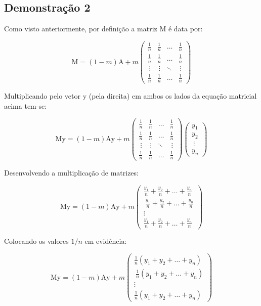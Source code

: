 \documentclass[a4paper, 12pt]{article}
\begin{document}
\subsection{Demonstração 2}

Como visto anteriormente, por definição a matriz $\mathrm{M}$ é data por:

$$\mathrm{M}=\left(1-m\right)\mathrm{A}+m\begin{pmatrix}
\frac{1}{n}&\frac{1}{n}&\dots &\frac{1}{n}\\
\frac{1}{n}&\frac{1}{n}&\dots &\frac{1}{n}\\
\ \vdots &\ \vdots &\ddots &\ \vdots \\
\frac{1}{n}&\frac{1}{n}&\dots &\frac{1}{n}
\end{pmatrix}$$

Multiplicando pelo vetor $\mathrm{y}$ (pela direita) em ambos os lados da equação matricial acima tem-se:

$$\mathrm{My}=\left(1-m\right)\mathrm{Ay}+m\begin{pmatrix}
\frac{1}{n}&\frac{1}{n}&\dots &\frac{1}{n}\\
\frac{1}{n}&\frac{1}{n}&\dots &\frac{1}{n}\\
\ \vdots &\ \vdots &\ddots &\ \vdots \\
\frac{1}{n}&\frac{1}{n}&\dots &\frac{1}{n}
\end{pmatrix}\begin{pmatrix}
y_1\\
y_2\\
\ \vdots \\
y_n
\end{pmatrix}$$

Desenvolvendo a multiplicação de matrizes:

$$\mathrm{My}=\left(1-m\right)\mathrm{Ay}+m\begin{pmatrix}
\frac{y_1}{n}+\frac{y_2}{n}+\dots +\frac{y_n}{n}\\
\ \frac{y_1}{n}+\frac{y_2}{n}+\dots +\frac{y_n}{n}\\
\vdots \\
\frac{y_1}{n}+\frac{y_2}{n}+\dots +\frac{y_n}{n}
\end{pmatrix}$$

Colocando os valores $1/n$ em evidência:

$$\mathrm{My}=\left(1-m\right)\mathrm{Ay}+m\begin{pmatrix}
\frac{1}{n}\left(y_1+y_2+\dots +y_n\right)\\
\ \frac{1}{n}\left(y_1+y_2+\dots +y_n\right)\\
\vdots \\
\frac{1}{n}\left(y_1+y_2+\dots +y_n\right)
\end{pmatrix}$$
\end{document}
